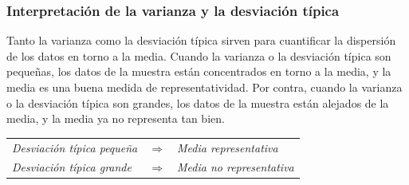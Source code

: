 \begin{frame}
\frametitle{Interpretación de la varianza y la desviación típica}
Tanto la varianza como la desviación típica sirven para cuantificar la dispersión de los datos en torno a la media.
Cuando la varianza o la desviación típica son pequeñas, los datos de la muestra están concentrados en torno a la media, y la media es una buena medida de representatividad. 
Por contra, cuando la varianza o la desviación típica son grandes, los datos de la muestra están alejados de la media, y la media ya no representa tan bien.
\begin{center}
\begin{tabular}{lcl}
\emph{Desviación típica pequeña} & $\Rightarrow$ & \emph{Media representativa}\\
\emph{Desviación típica grande} & $\Rightarrow$ & \emph{Media no representativa}\\
\end{tabular}
\end{center}

\begin{center}
\scalebox{1}{}

\end{center}

\end{frame}


